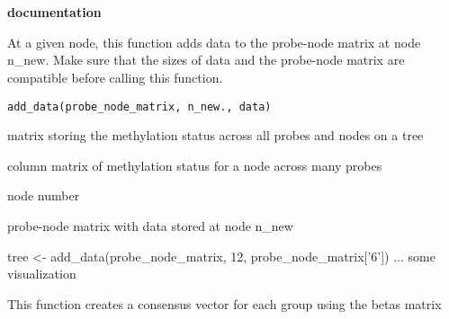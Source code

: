 \documentclass[a4paper]{book}
\begin{document}
\chapter*{}
\begin{center}
{\textbf{\huge \R{} documentation}} \par{}
\par\bigskip{\large \today}
\end{center}
%
\begin{Description}\relax
At a given node, this function adds data to the probe-node matrix at node 
n\_new. Make sure that the sizes of data and the probe-node matrix are 
compatible before calling this function.
\end{Description}
%
\begin{Usage}
\begin{verbatim}
add_data(probe_node_matrix, n_new., data)
\end{verbatim}
\end{Usage}
%
\begin{Arguments}
\begin{ldescription}
\item[\code{probe\_node\_matrix}] matrix storing the methylation status across all
probes and nodes on a tree

\item[\code{data}] column matrix of methylation status for a node across many 
probes

\item[\code{n\_new}] node number
\end{ldescription}
\end{Arguments}
%
\begin{Value}
probe-node matrix with data stored at node n\_new
\end{Value}
%
\begin{Examples}
\begin{ExampleCode}
tree <- add_data(probe_node_matrix, 12, probe_node_matrix['6'])
... some visualization 
\end{ExampleCode}
\end{Examples}
%
\begin{Description}\relax
This function creates a consensus vector for each group using the betas 
matrix
\end{Description}
\end{document}
